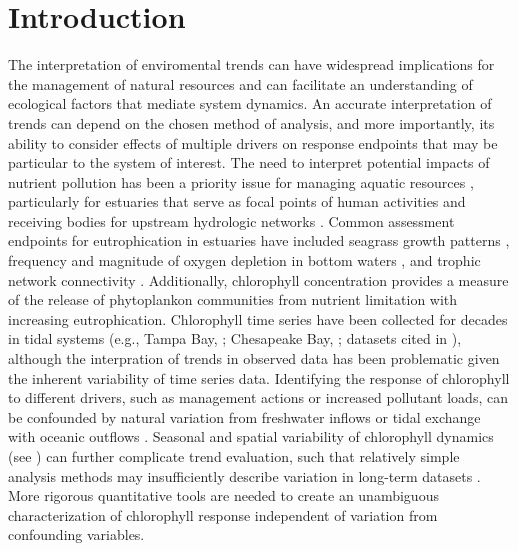 \documentclass[letterpaper,12pt,oneside]{article}\usepackage[]{graphicx}\usepackage[]{color}
\begin{document}
\clearpage

\acresetall

\section{Introduction}

The interpretation of enviromental trends can have widespread implications for the management of natural resources and can facilitate an understanding of ecological factors that mediate system dynamics.  An accurate interpretation of trends can depend on the chosen method of analysis, and more importantly, its ability to consider effects of multiple drivers on response endpoints that may be particular to the system of interest.  The need to interpret potential impacts of nutrient pollution has been a priority issue for managing aquatic resources \citep{Nixon95}, particularly for estuaries that serve as focal points of human activities and receiving bodies for upstream hydrologic networks \citep{Paerl14}.  Common assessment endpoints for eutrophication in estuaries have included seagrass growth patterns \citep{Steward07}, frequency and magnitude of oxygen depletion in bottom waters \citep{Paerl06}, and trophic network connectivity \citep{Powers05}.  Additionally, chlorophyll concentration provides a measure of the release of phytoplankon communities from nutrient limitation with increasing eutrophication.  Chlorophyll time series have been collected for decades in tidal systems (e.g., Tampa Bay, \citet{TBEP11}; Chesapeake Bay, \citet{Harding94}; datasets cited in \citet{Monbet92,Cloern10}), although the interpration of trends in observed data has been problematic given the inherent variability of time series data. Identifying the response of chlorophyll to different drivers, such as management actions or increased pollutant loads, can be confounded by natural variation from freshwater inflows \citep{Borsuk04b} or tidal exchange with oceanic outflows \citep{Monbet92}.  Seasonal and spatial variability of chlorophyll dynamics (see \citet{Cloern96}) can further complicate trend evaluation, such that relatively simple analysis methods may insufficiently describe variation in long-term datasets \citep{Hirsch14b}.  More rigorous quantitative tools are needed to create an unambiguous characterization of chlorophyll response independent of variation from confounding variables.
\end{document}
